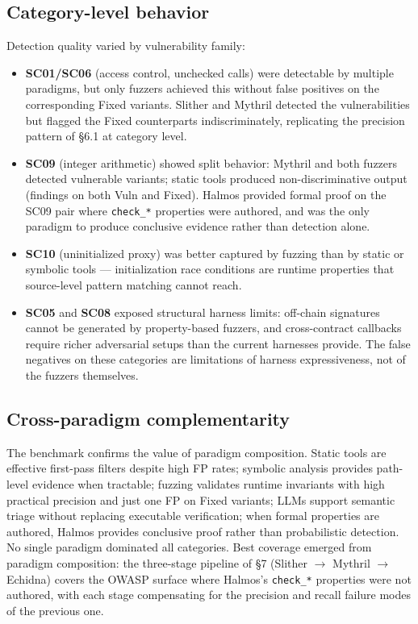\FloatBarrier
\subsection{Category-level behavior}

Detection quality varied by vulnerability family:
\begin{itemize}
	\item \textbf{SC01/SC06} (access control, unchecked calls) were detectable by multiple paradigms, but only fuzzers achieved this without false positives on the corresponding Fixed variants. Slither and Mythril detected the vulnerabilities but flagged the Fixed counterparts indiscriminately, replicating the precision pattern of §6.1 at category level.
	\item \textbf{SC09} (integer arithmetic) showed split behavior: Mythril and both fuzzers detected vulnerable variants; static tools produced non-discriminative output (findings on both Vuln and Fixed). Halmos provided formal proof on the SC09 pair where \texttt{check\_*} properties were authored, and was the only paradigm to produce conclusive evidence rather than detection alone.
	\item \textbf{SC10} (uninitialized proxy) was better captured by fuzzing than by static or symbolic tools — initialization race conditions are runtime properties that source-level pattern matching cannot reach.
	\item \textbf{SC05} and \textbf{SC08} exposed structural harness limits: off-chain signatures cannot be generated by property-based fuzzers, and cross-contract callbacks require richer adversarial setups than the current harnesses provide. The false negatives on these categories are limitations of harness expressiveness, not of the fuzzers themselves.
\end{itemize}

\subsection{Cross-paradigm complementarity}

The benchmark confirms the value of paradigm composition. Static tools are effective first-pass filters despite high FP rates; symbolic analysis provides path-level evidence when tractable; fuzzing validates runtime invariants with high practical precision and just one FP on Fixed variants; LLMs support semantic triage without replacing executable verification; when formal properties are authored, Halmos provides conclusive proof rather than probabilistic detection. No single paradigm dominated all categories. Best coverage emerged from paradigm composition: the three-stage pipeline of §7 (Slither $\rightarrow$ Mythril $\rightarrow$ Echidna) covers the OWASP surface where Halmos's \texttt{check\_*} properties were not authored, with each stage compensating for the precision and recall failure modes of the previous one.